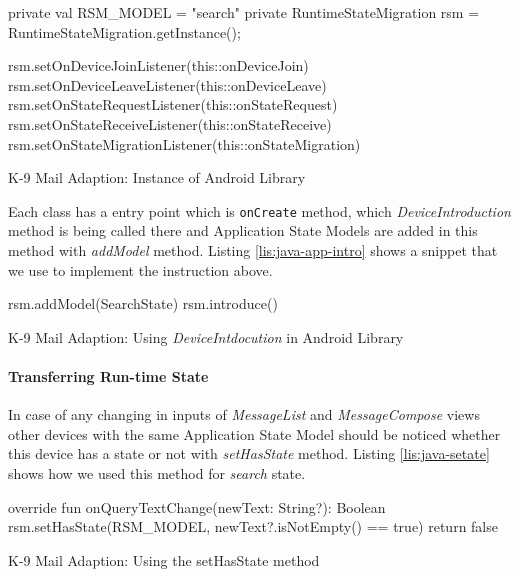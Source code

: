 \FloatBarrier
\begin{code}
\begin{javas}
private val RSM_MODEL = "search"
private RuntimeStateMigration rsm = RuntimeStateMigration.getInstance();

rsm.setOnDeviceJoinListener(this::onDeviceJoin)
rsm.setOnDeviceLeaveListener(this::onDeviceLeave)
rsm.setOnStateRequestListener(this::onStateRequest)
rsm.setOnStateReceiveListener(this::onStateReceive)
rsm.setOnStateMigrationListener(this::onStateMigration)       
\end{javas}
\caption{K-9 Mail Adaption: Instance of Android Library}
\label{lis:java-app-instance}
\end{code}
\FloatBarrier

Each class has a entry point which is \lstinline[basicstyle=\ttfamily]{onCreate} method, which \textit{DeviceIntroduction} method is being called there and Application State Models are added in this method with \textit{addModel} method. Listing \ref{lis:java-app-intro} shows a snippet that we use to implement the instruction above.

\FloatBarrier
\begin{code}
\begin{java}
rsm.addModel(SearchState)
rsm.introduce()
\end{java}
\caption{K-9 Mail Adaption: Using \textit{DeviceIntdocution} in Android Library}
\label{lis:java-app-intro}
\end{code}
\FloatBarrier

\paragraph{Transferring Run-time State}
In case of any changing in inputs of \textit{MessageList} and \textit{MessageCompose} views other devices with the same Application State Model should be noticed whether this device has a state or not with \textit{setHasState} method. Listing \ref{lis:java-setate} shows how we used this method for \textit{search} state.

\FloatBarrier
\begin{code}
\begin{java}
override fun onQueryTextChange(newText: String?): Boolean {
    rsm.setHasState(RSM_MODEL, newText?.isNotEmpty() == true)
    return false
}
\end{java}
\caption{K-9 Mail Adaption: Using the setHasState method}
\label{lis:java-setate}
\end{code}
\FloatBarrier


